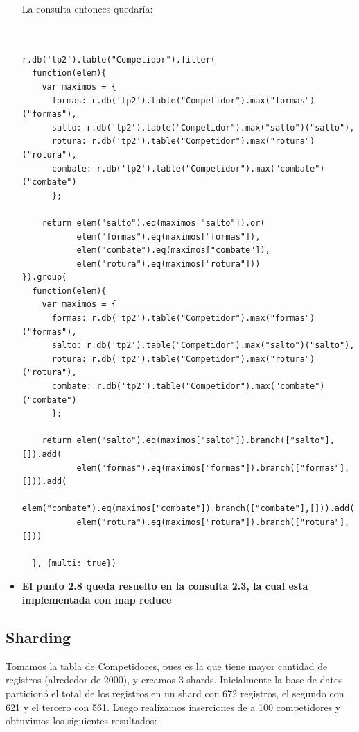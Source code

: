 \begin{itemize}
{La consulta entonces quedaría:\\ \\

\begin{verbatim}

r.db('tp2').table("Competidor").filter(
  function(elem){
    var maximos = {
      formas: r.db('tp2').table("Competidor").max("formas")("formas"),
      salto: r.db('tp2').table("Competidor").max("salto")("salto"),
      rotura: r.db('tp2').table("Competidor").max("rotura")("rotura"),
      combate: r.db('tp2').table("Competidor").max("combate")("combate")
      };
    
    return elem("salto").eq(maximos["salto"]).or(
           elem("formas").eq(maximos["formas"]),
           elem("combate").eq(maximos["combate"]),
           elem("rotura").eq(maximos["rotura"]))
}).group(
  function(elem){
    var maximos = {
      formas: r.db('tp2').table("Competidor").max("formas")("formas"),
      salto: r.db('tp2').table("Competidor").max("salto")("salto"),
      rotura: r.db('tp2').table("Competidor").max("rotura")("rotura"),
      combate: r.db('tp2').table("Competidor").max("combate")("combate")
      };
    
    return elem("salto").eq(maximos["salto"]).branch(["salto"],[]).add(
           elem("formas").eq(maximos["formas"]).branch(["formas"],[])).add(
           elem("combate").eq(maximos["combate"]).branch(["combate"],[])).add(
           elem("rotura").eq(maximos["rotura"]).branch(["rotura"],[]))
    
  }, {multi: true})

\end{verbatim}
}

\item \textbf{El punto 2.8 queda resuelto en la consulta 2.3, la cual esta 
implementada con map reduce}

\end{itemize}

\subsection{Sharding}

Tomamos la tabla de Competidores, pues es la que tiene mayor cantidad de 
registros (alrededor de 2000), y creamos 3 shards. Inicialmente la base 
de datos particion\'o el total de los registros en un shard con 672 
registros, el segundo con 621 y el tercero con 561. Luego realizamos 
inserciones de a 100 competidores y obtuvimos los siguientes resultados: \\ \\

